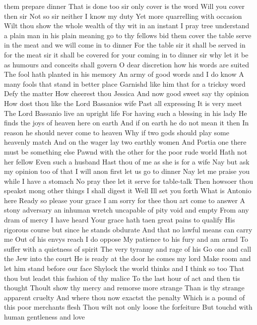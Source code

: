 them prepare dinner 
That is done too sir only cover is the word 
Will you cover then sir 
Not so sir neither I know my duty 
Yet more quarrelling with occasion Wilt thou show 
the whole wealth of thy wit in an instant I pray 
tree understand a plain man in his plain meaning 
go to thy fellows bid them cover the table serve 
in the meat and we will come in to dinner 
For the table sir it shall be served in for the 
meat sir it shall be covered for your coming in 
to dinner sir why let it be as humours and 
conceits shall govern 
O dear discretion how his words are suited 
The fool hath planted in his memory 
An army of good words and I do know 
A many fools that stand in better place 
Garnishd like him that for a tricksy word 
Defy the matter How cheerest thou Jessica 
And now good sweet say thy opinion 
How dost thou like the Lord Bassanios wife 
Past all expressing It is very meet 
The Lord Bassanio live an upright life 
For having such a blessing in his lady 
He finds the joys of heaven here on earth 
And if on earth he do not mean it then 
In reason he should never come to heaven 
Why if two gods should play some heavenly match 
And on the wager lay two earthly women 
And Portia one there must be something else 
Pawnd with the other for the poor rude world 
Hath not her fellow 
Even such a husband 
Hast thou of me as she is for a wife 
Nay but ask my opinion too of that 
I will anon first let us go to dinner 
Nay let me praise you while I have a stomach 
No pray thee let it serve for table-talk 
 Then howsoer thou speakst mong other things 
I shall digest it 
Well Ill set you forth 
What is Antonio here 
Ready so please your grace 
I am sorry for thee thou art come to answer 
A stony adversary an inhuman wretch 
uncapable of pity void and empty 
From any dram of mercy 
I have heard 
Your grace hath taen great pains to qualify 
His rigorous course but since he stands obdurate 
And that no lawful means can carry me 
Out of his envys reach I do oppose 
My patience to his fury and am armd 
To suffer with a quietness of spirit 
The very tyranny and rage of his 
Go one and call the Jew into the court 
He is ready at the door he comes my lord 
Make room and let him stand before our face 
Shylock the world thinks and I think so too 
That thou but leadst this fashion of thy malice 
To the last hour of act and then tis thought 
Thoult show thy mercy and remorse more strange 
Than is thy strange apparent cruelty 
And where thou now exactst the penalty 
Which is a pound of this poor merchants flesh 
Thou wilt not only loose the forfeiture 
But touchd with human gentleness and love 
